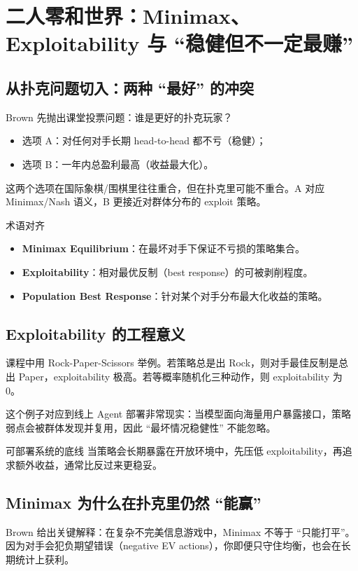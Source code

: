 \section{二人零和世界：Minimax、Exploitability 与 ``稳健但不一定最赚''}

\subsection{从扑克问题切入：两种 ``最好'' 的冲突}
Brown 先抛出课堂投票问题：谁是更好的扑克玩家？
\begin{itemize}
    \item 选项 A：对任何对手长期 head-to-head 都不亏（稳健）；
    \item 选项 B：一年内总盈利最高（收益最大化）。
\end{itemize}
这两个选项在国际象棋/围棋里往往重合，但在扑克里可能不重合。A 对应 Minimax/Nash 语义，B 更接近对群体分布的 exploit 策略。

\begin{knowledgebox}{术语对齐}
\begin{itemize}
    \item \textbf{Minimax Equilibrium}：在最坏对手下保证不亏损的策略集合。
    \item \textbf{Exploitability}：相对最优反制（best response）的可被剥削程度。
    \item \textbf{Population Best Response}：针对某个对手分布最大化收益的策略。
\end{itemize}
\end{knowledgebox}

\subsection{Exploitability 的工程意义}
课程中用 Rock-Paper-Scissors 举例。若策略总是出 Rock，则对手最佳反制是总出 Paper，exploitability 极高。若等概率随机化三种动作，则 exploitability 为 0。

这个例子对应到线上 Agent 部署非常现实：当模型面向海量用户暴露接口，策略弱点会被群体发现并复用，因此 ``最坏情况稳健性'' 不能忽略。

\begin{importantbox}{可部署系统的底线}
当策略会长期暴露在开放环境中，先压低 exploitability，再追求额外收益，通常比反过来更稳妥。
\end{importantbox}

\subsection{Minimax 为什么在扑克里仍然 ``能赢''}
Brown 给出关键解释：在复杂不完美信息游戏中，Minimax 不等于 ``只能打平''。因为对手会犯负期望错误（negative EV actions），你即便只守住均衡，也会在长期统计上获利。

